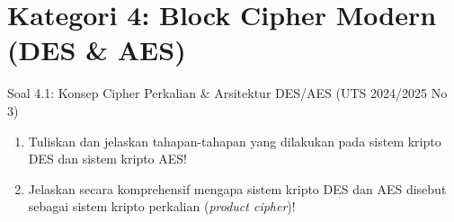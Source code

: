\documentclass[11pt,a4paper]{article}
\begin{document}
\newpage
\section{Kategori 4: Block Cipher Modern (DES \& AES)}

\begin{soalbox}{Soal 4.1: Konsep Cipher Perkalian \& Arsitektur DES/AES (UTS 2024/2025 No 3)}
\begin{enumerate}[label=(\alph*)]
    \item Tuliskan dan jelaskan tahapan-tahapan yang dilakukan pada sistem kripto DES dan sistem kripto AES!
    \item Jelaskan secara komprehensif mengapa sistem kripto DES dan AES disebut sebagai sistem kripto perkalian (\textit{product cipher})!
\end{enumerate}
\end{soalbox}
\end{document}
